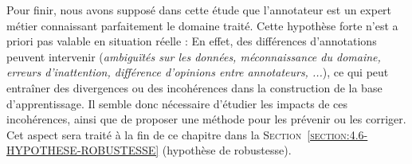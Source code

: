 			Pour finir, nous avons supposé dans cette étude que l'annotateur est un expert métier connaissant parfaitement le domaine traité.
			Cette hypothèse forte n'est a priori pas valable en situation réelle : En effet, des différences d'annotations peuvent intervenir (\textit{ambiguïtés sur les données, méconnaissance du domaine, erreurs d'inattention, différence d'opinions entre annotateurs, ...}), ce qui peut entraîner des divergences ou des incohérences dans la construction de la base d'apprentissage.
			Il semble donc nécessaire d'étudier les impacts de ces incohérences, ainsi que de proposer une méthode pour les prévenir ou les corriger.
			Cet aspect sera traité à la fin de ce chapitre dans la \textsc{Section~\ref{section:4.6-HYPOTHESE-ROBUSTESSE}} (hypothèse de robustesse).